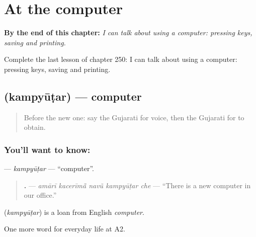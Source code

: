 
\chapter{At the computer}
\label{ch:gu-at-the-computer}

\begin{chapteropening}
\textbf{By the end of this chapter:} \emph{I can talk about using a computer: pressing keys, saving and printing.}

Complete the last lesson of chapter 250: I can talk about using a computer: pressing keys, saving and printing.
\end{chapteropening}

\section[\texorpdfstring{\gu{કમ્પ્યૂટર} (kampyūṭar)}{કમ્પ્યૂટર (kampyūṭar)}]{ (kampyūṭar) — computer}

\label{lesson:GU-C250-kampyutar}



\begin{quote}
Before the new one: say the Gujarati for voice, then the Gujarati for to obtain.
\end{quote}

\subsection*{You'll want to know: }
\textbf{} — \emph{kampyūṭar} — \textquotedblleft{}computer\textquotedblright{}.

\begin{quote}
\textbf{    .} — \emph{amārī kacerīmā̃ navũ kampyūṭar che} — \textquotedblleft{}There is a new computer in our office.\textquotedblright{}
\end{quote}

\begin{cousinweb}
\textbf{} (\emph{kampyūṭar}) is a loan from English \emph{computer}.
\end{cousinweb}

\begin{grammarlens}[title={What you've built}]
One more word for everyday life at A2.
\end{grammarlens}

